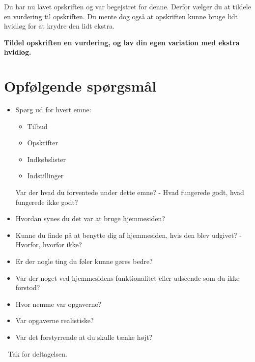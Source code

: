 Du har nu lavet opskriften og var begejstret for denne. Derfor vælger du at tildele en vurdering til opskriften.
Du mente dog også at opskriften kunne bruge lidt hvidløg for at krydre den lidt ekstra. 

\textbf{Tildel opskriften en vurdering, og lav din egen variation med ekstra hvidløg.}


\section{Opfølgende spørgsmål}

\begin{itemize}
	\item Spørg ud for hvert emne:
		\begin{itemize}
			\item Tilbud
			\item Opskrifter
			\item Indkøbslister
			\item Indstillinger
		\end{itemize}
	Var der hvad du forventede under dette emne? - Hvad fungerede godt, hvad fungerede ikke godt?
	\item Hvordan synes du det var at bruge hjemmesiden?
	\item Kunne du finde på at benytte dig af hjemmesiden, hvis den blev udgivet? - Hvorfor, hvorfor ikke?
	\item Er der nogle ting du føler kunne gøres bedre?
	\item Var der noget ved hjemmesidens funktionalitet eller udseende som du ikke forstod?
	\item Hvor nemme var opgaverne?
	\item Var opgaverne realistiske?
	\item Var det forstyrrende at du skulle tænke højt?
\end{itemize}

Tak for deltagelsen.